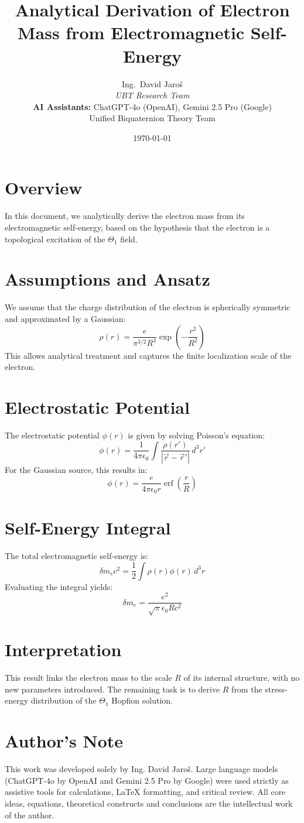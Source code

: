 \documentclass{article}
\title{Analytical Derivation of Electron Mass from Electromagnetic Self-Energy}
\author{
Ing.~David Jaroš \\
\textit{UBT Research Team} \\
\textbf{AI Assistants:} ChatGPT-4o (OpenAI), Gemini 2.5 Pro (Google) \\
Unified Biquaternion Theory Team}
\date{\today}
\begin{document}
\maketitle

\section*{Overview}
In this document, we analytically derive the electron mass from its electromagnetic self-energy, based on the hypothesis that the electron is a topological excitation of the $\Theta_1$ field.

\section*{Assumptions and Ansatz}
We assume that the charge distribution of the electron is spherically symmetric and approximated by a Gaussian:
\[
\rho(r) = \frac{e}{\pi^{3/2} R^3} \exp\left(-\frac{r^2}{R^2}\right)
\]
This allows analytical treatment and captures the finite localization scale of the electron.

\section*{Electrostatic Potential}
The electrostatic potential $\phi(r)$ is given by solving Poisson's equation:
\[
\phi(r) = \frac{1}{4\pi\epsilon_0} \int \frac{\rho(r')}{|\vec{r} - \vec{r}'|} \, d^3r'
\]
For the Gaussian source, this results in:
\[
\phi(r) = \frac{e}{4\pi\epsilon_0 r} \operatorname{erf}\left( \frac{r}{R} \right)
\]

\section*{Self-Energy Integral}
The total electromagnetic self-energy is:
\[
\delta m_e c^2 = \frac{1}{2} \int \rho(r) \phi(r) \, d^3r
\]
Evaluating the integral yields:
\[
\delta m_e = \frac{e^2}{\sqrt{\pi} \epsilon_0 R c^2}
\]

\section*{Interpretation}
This result links the electron mass to the scale $R$ of its internal structure, with no new parameters introduced. The remaining task is to derive $R$ from the stress-energy distribution of the $\Theta_1$ Hopfion solution.


\section*{Author's Note}

This work was developed solely by Ing. David Jaroš.  
Large language models (ChatGPT-4o by OpenAI and Gemini 2.5 Pro by Google) were used strictly as assistive tools for calculations, LaTeX formatting, and critical review.  
All core ideas, equations, theoretical constructs and conclusions are the intellectual work of the author.
\end{document}
